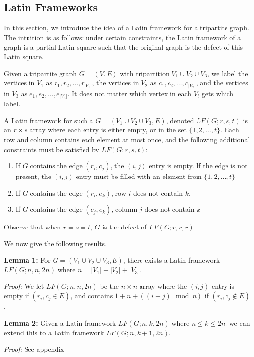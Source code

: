 \documentclass[11pt]{article}
\begin{document}
\subsection{Latin Frameworks}

In this section, we introduce the idea of a Latin framework for a tripartite graph. The intuition is as follows: under certain constraints, the Latin framework of a graph is a partial Latin square such that the original graph is the defect of this Latin square.

Given a tripartite graph $G = (V,E)$ with tripartition $V_1 \cup V_2 \cup V_3$, we label the vertices in $V_1$ as $r_1,r_2,\dots,r_{|V_1|}$, the vertices in $V_2$ as $c_1,c_2,\dots,c_{|V_2|}$, and the vertices in $V_3$ as $e_1,e_2,\dots,e_{|V_3|}$. It does not matter which vertex in each $V_i$ gets which label.

A Latin framework for such a $G = (V_1 \cup V_2 \cup V_3,E)$, denoted $LF(G;r,s,t)$ is an $r \times s$ array where each entry is either empty, or in the set $\{1,2,\dots,t\}$. Each row and column contains each element at most once, and the following additional constraints must be satisfied by $LF(G;r,s,t)$:
\begin{enumerate}
\item If $G$ contains the edge $(r_i,c_j)$, the $(i,j)$ entry is empty. If the edge is not present, the $(i,j)$ entry must be filled with an element from $\{1,2,\dots,t\}$
\item If $G$ contains the edge $(r_i,e_k)$, row $i$ does not contain $k$.
\item If $G$ contains the edge $(c_j,e_k)$, column $j$ does not contain $k$
\end{enumerate}

Observe that when $r = s = t$, $G$ is the defect of $LF(G;r,r,r)$. 

We now give the following results.

\textbf{Lemma 1:} For $G = (V_1 \cup V_2 \cup V_3,E)$, there exists a Latin framework $LF(G;n,n,2n)$ where $n = |V_1| + |V_2| + |V_3|$.

\emph{Proof:} We let $LF(G;n,n,2n)$ be the $n \times n$ array where the $(i,j)$ entry is empty if $(r_i,c_j \in E)$, and contains $1 + n + ((i+j) \mod n)$ if $(r_i,c_j \not\in E)$.

\textbf{Lemma 2:} Given a Latin framework $LF(G;n,k,2n)$ where $n \leq k \leq 2n$, we can extend this to a Latin framework $LF(G;n,k+1,2n)$.

\emph{Proof:} See appendix
\end{document}
